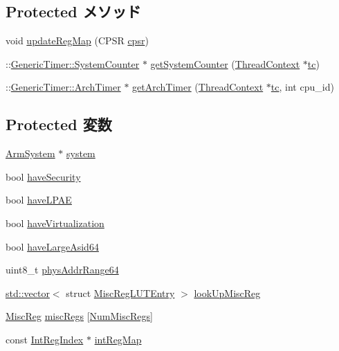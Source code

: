 \subsection*{Protected メソッド}
\begin{DoxyCompactItemize}
\item 
void \hyperlink{structArmISA_1_1ISA_a2459588c548b25984ed5b75051741841}{updateRegMap} (CPSR \hyperlink{namespaceArmISA_ad377bf9b9c48f8cf3e8e918e0847b1fe}{cpsr})
\item 
::\hyperlink{classGenericTimer_1_1SystemCounter}{GenericTimer::SystemCounter} $\ast$ \hyperlink{structArmISA_1_1ISA_ae498e9dac91e31ef155c01f0f15113ff}{getSystemCounter} (\hyperlink{classThreadContext}{ThreadContext} $\ast$\hyperlink{namespaceArmISA_a5aff829af55e65b802d83dfcef4e9dd0}{tc})
\item 
::\hyperlink{classGenericTimer_1_1ArchTimer}{GenericTimer::ArchTimer} $\ast$ \hyperlink{structArmISA_1_1ISA_a0b17cffd3a0fd5aa2339f4533db424d1}{getArchTimer} (\hyperlink{classThreadContext}{ThreadContext} $\ast$\hyperlink{namespaceArmISA_a5aff829af55e65b802d83dfcef4e9dd0}{tc}, int cpu\_\-id)
\end{DoxyCompactItemize}
\subsection*{Protected 変数}
\begin{DoxyCompactItemize}
\item 
\hyperlink{classArmSystem}{ArmSystem} $\ast$ \hyperlink{structArmISA_1_1ISA_a5c1351250909b50f57e70dbb5bf443d8}{system}
\item 
bool \hyperlink{structArmISA_1_1ISA_a9f135583566fb70bba3c10395368f2e4}{haveSecurity}
\item 
bool \hyperlink{structArmISA_1_1ISA_a8e8469d916956ca8b9052ebd6f155e0b}{haveLPAE}
\item 
bool \hyperlink{structArmISA_1_1ISA_a48e6871d9ab14ff31b50307f0c617f95}{haveVirtualization}
\item 
bool \hyperlink{structArmISA_1_1ISA_a3aea18414c83c86fa366401cb767e7ab}{haveLargeAsid64}
\item 
uint8\_\-t \hyperlink{structArmISA_1_1ISA_a4ab96b1a55880cac440e81e794c6f8d7}{physAddrRange64}
\item 
\hyperlink{classstd_1_1vector}{std::vector}$<$ struct \hyperlink{structArmISA_1_1ISA_1_1MiscRegLUTEntry}{MiscRegLUTEntry} $>$ \hyperlink{structArmISA_1_1ISA_ad38b21495dd061c39be969173cdd1c8d}{lookUpMiscReg}
\item 
\hyperlink{namespaceArmISA_aa16539aa6584fd12f7d6fa868f75b4de}{MiscReg} \hyperlink{structArmISA_1_1ISA_a1719a90e78518ac5e323ce1fb9fe3639}{miscRegs} \mbox{[}\hyperlink{namespaceArmISA_a568d4aa96dd7cd963f3b1b1b0446c9c6}{NumMiscRegs}\mbox{]}
\item 
const \hyperlink{namespaceArmISA_ae64680ba9fb526106829d6bf92fc791b}{IntRegIndex} $\ast$ \hyperlink{structArmISA_1_1ISA_afb6be991f3bd99efccaadb4e55a09c1a}{intRegMap}
\end{DoxyCompactItemize}
